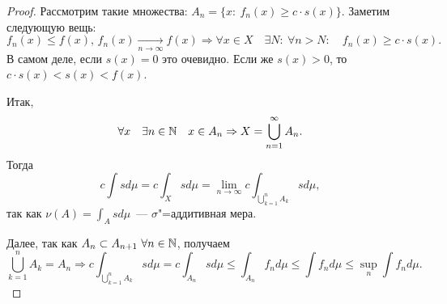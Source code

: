 \begin{theorem}
\begin{proof}
        Рассмотрим такие множества: $A_n=\{x:\: f_n(x)\geqslant c\cdot s(x)\}$.
        Заметим следующую вещь: \[
            f_n(x)\leqslant f(x),\, f_n(x)\xrightarrow[n\to\infty]{}f(x)\Rightarrow
            \forall x\in X \quad \exists N:\: \forall n>N:\quad f_n(x)\geqslant c\cdot s(x).
        \]
        В самом деле, если $s(x)=0$ это очевидно. Если же $s(x)>0$, то $c\cdot s(x)<s(x)<f(x)$.

        Итак, \[
            \forall x\quad \exists n\in\mathbb{N}\quad x\in A_n\Rightarrow X=\bigcup_{n=1}^{\infty}A_n.
        \]
        Тогда \[
            c\int sd\mu=c\int_X sd\mu=\lim_{n\to\infty} c\int_{\bigcup_{k=1}^n A_k} sd\mu,
        \]
        так как $\nu(A)=\int_A sd\mu$~--- $\sigma$"=аддитивная мера.

        Далее, так как $A_n\subset A_{n+1}\ \forall n\in\mathbb{N}$, получаем \[
            \bigcup_{k=1}^n A_k=A_n\Rightarrow c\int_{\bigcup_{k=1}^n A_k}sd\mu=
            c\int_{A_n}sd\mu\leqslant\int_{A_n}f_nd\mu\leqslant
            \int f_nd\mu\leqslant\sup_{n}\int f_nd\mu.
        \]

    \end{proof}
\end{theorem}

